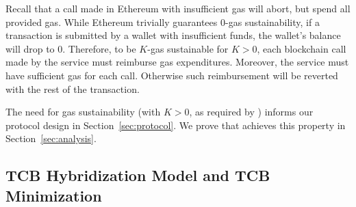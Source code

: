 Recall that a call made in Ethereum with insufficient gas will abort, but spend all provided gas. While Ethereum trivially guarantees 0-gas sustainability, if a transaction is submitted by a wallet with insufficient funds, the wallet's balance will drop to 0.
Therefore, to be $K$-gas sustainable for $K > 0$, each blockchain call made by the service must reimburse gas expenditures.
Moreover, the service must have sufficient gas for each call. Otherwise such reimbursement will be reverted with the rest of the transaction.

The need for gas sustainability (with $K > 0$, as required by \tc) informs our protocol design in Section~\ref{sec:protocol}. We prove that \tc achieves this property in Section~\ref{sec:analysis}.

\subsection{TCB Hybridization Model and TCB Minimization}
\label{sec:tcb-hybridization}

\newcommand{\tcboff}{\ensuremath{\mathcal{A}_{\textsf{Off}}}\xspace}
\newcommand{\tcbon}{\ensuremath{\mathcal{A}_{\textsf{On}}}\xspace}
\newcommand{\oauth}{\ensuremath{\mathcal{O}_{\textsf{Auth}}}\xspace}
\newcommand{\pkoff}{\ensuremath{\textsf{pk}_{\textsf{Off}}}\xspace}

